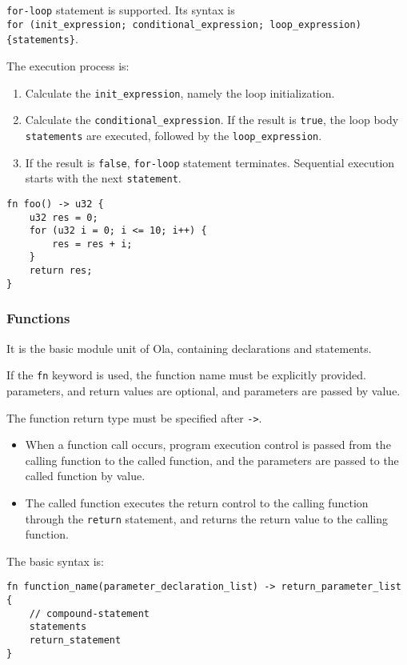\verb|for-loop| statement is supported. Its syntax is \\
\verb|for (init_expression; conditional_expression; loop_expression) {statements}|.

The execution process is:
\begin{enumerate}
    \item Calculate the \verb|init_expression|, namely the loop initialization.
    \item Calculate the \verb|conditional_expression|. If the result is \verb|true|, the loop body \verb|statements| are executed, followed by the \verb|loop_expression|.
    \item If the result is \verb|false|, \verb|for-loop| statement terminates. Sequential execution starts with the next \verb|statement|.
\end{enumerate}

\begin{lstlisting}
fn foo() -> u32 {
    u32 res = 0;
    for (u32 i = 0; i <= 10; i++) {
        res = res + i;
    }
    return res;
}
\end{lstlisting}

\subsubsection{Functions}

It is the basic module unit of Ola, containing declarations and statements.

If the \verb|fn| keyword is used, the function name must be explicitly provided. parameters, and return values are optional, and parameters are passed by value.

The function return type must be specified after \verb|->|.

\begin{itemize}
    \item When a function call occurs, program execution control is passed from the calling function to the called function, and the parameters are passed to the called function by value. 
    \item The called function executes the return control to the calling function through the \verb|return| statement, and returns the return value to the calling function.
\end{itemize}

The basic syntax is:

\begin{lstlisting}
fn function_name(parameter_declaration_list) -> return_parameter_list {
    // compound-statement
    statements
    return_statement
}
\end{lstlisting}

